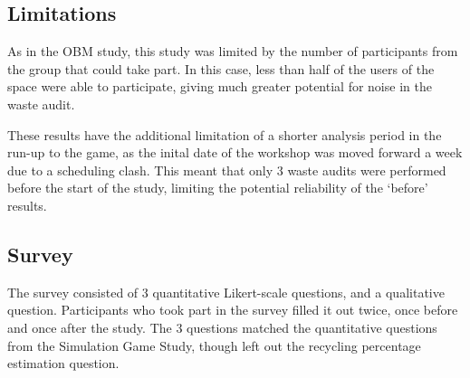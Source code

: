 \documentclass[nofonts,nols,justified,nobib]{tufte-book}
\begin{document}
\subsection*{Limitations}
As in the OBM study, this study was limited by the number of participants from the group that could take part. In this case, less than half of the users of the space were able to participate, giving much greater potential for noise in the waste audit. 

These results have the additional limitation of a shorter analysis period in the run-up to the game, as the inital date of the workshop was moved forward a week due to a scheduling clash. This meant that only 3 waste audits were performed before the start of the study, limiting the potential reliability of the `before' results.

\subsection*{Survey}
The survey consisted of 3 quantitative Likert-scale questions, and a qualitative question. Participants who took part in the survey filled it out twice, once before and once after the study. The 3 questions matched the quantitative questions from the Simulation Game Study, though left out the recycling percentage estimation question.
\end{document}
